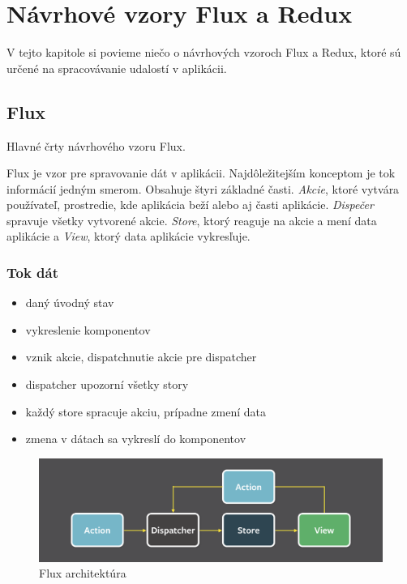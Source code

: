 \chapter{Návrhové vzory Flux a Redux}

\label{kap:vzory} %

V tejto kapitole si povieme niečo o návrhových vzoroch Flux a Redux, ktoré sú určené na spracovávanie udalostí v aplikácii.

\section{Flux}
Hlavné črty návrhového vzoru Flux. \cite[Overview]{Flux}

Flux je vzor pre spravovanie dát v aplikácii. Najdôležitejším konceptom je tok informácií jedným smerom. Obsahuje štyri základné časti. \emph{Akcie}, ktoré vytvára používateľ, prostredie, kde aplikácia beží alebo aj časti aplikácie. \emph{Dispečer} spravuje všetky vytvorené akcie. \emph{Store}, ktorý reaguje na akcie a mení data aplikácie a \emph{View}, ktorý data aplikácie vykresľuje.

\subsection{Tok dát}%
\begin{itemize}
\item daný úvodný stav
\item vykreslenie komponentov
\item vznik akcie, dispatchnutie akcie pre dispatcher
\item dispatcher upozorní všetky story
\item každý store spracuje akciu, prípadne zmení data
\item zmena v dátach sa vykreslí do komponentov
\end{itemize}


\begin{figure}
  \centering
    \includegraphics[width=\textwidth]{./images/flux.png}
  \caption{Flux architektúra}
\end{figure}

